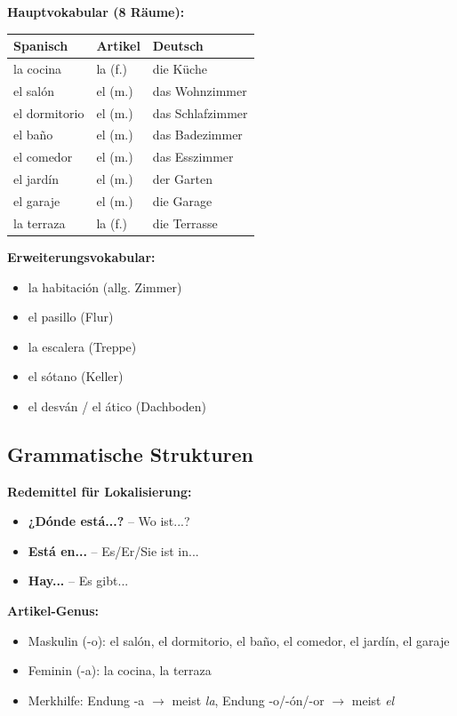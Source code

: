 \documentclass[11pt,a4paper]{article}
\begin{document}
\textbf{Hauptvokabular (8 Räume):}
\begin{center}
\begin{tabular}{|l|l|l|}
\hline
\textbf{Spanisch} & \textbf{Artikel} & \textbf{Deutsch} \\
\hline
la cocina & la (f.) & die Küche \\
el salón & el (m.) & das Wohnzimmer \\
el dormitorio & el (m.) & das Schlafzimmer \\
el baño & el (m.) & das Badezimmer \\
el comedor & el (m.) & das Esszimmer \\
el jardín & el (m.) & der Garten \\
el garaje & el (m.) & die Garage \\
la terraza & la (f.) & die Terrasse \\
\hline
\end{tabular}
\end{center}

\textbf{Erweiterungsvokabular:}
\begin{itemize}
    \item la habitación (allg. Zimmer)
    \item el pasillo (Flur)
    \item la escalera (Treppe)
    \item el sótano (Keller)
    \item el desván / el ático (Dachboden)
\end{itemize}

\subsection{Grammatische Strukturen}

\textbf{Redemittel für Lokalisierung:}
\begin{itemize}
    \item \textbf{¿Dónde está...?} -- Wo ist...?
    \item \textbf{Está en...} -- Es/Er/Sie ist in...
    \item \textbf{Hay...} -- Es gibt...
\end{itemize}

\textbf{Artikel-Genus:}
\begin{itemize}
    \item Maskulin (-o): el salón, el dormitorio, el baño, el comedor, el jardín, el garaje
    \item Feminin (-a): la cocina, la terraza
    \item Merkhilfe: Endung -a $\rightarrow$ meist \textit{la}, Endung -o/-ón/-or $\rightarrow$ meist \textit{el}
\end{itemize}
\end{document}
